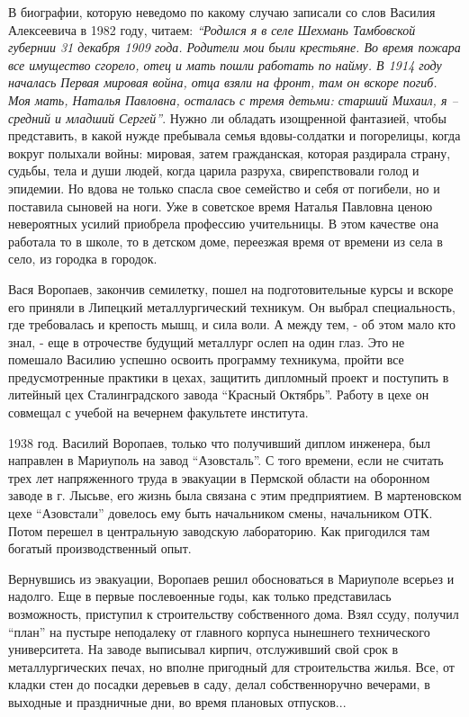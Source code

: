 В биографии, которую неведомо по какому случаю записали со слов Василия
Алексеевича в 1982 году, читаем: \emph{\enquote{Родился я в селе Шехмань Тамбовской губернии
31 декабря 1909 года. Родители мои были крестьяне. Во время пожара все
имущество сгорело, отец и мать пошли работать по найму. В 1914 году началась
Первая мировая война, отца взяли на фронт, там он вскоре погиб. Моя мать,
Наталья Павловна, осталась с тремя детьми: старший Михаил, я – средний и
младший Сергей}}. Нужно ли обладать изощренной фантазией, чтобы представить, в
какой нужде пребывала семья вдовы-солдатки и погорелицы, когда вокруг полыхали
войны: мировая, затем гражданская, которая раздирала страну, судьбы, тела и
души людей, когда царила разруха, свирепствовали голод и эпидемии. Но вдова не
только спасла свое семейство и себя от погибели, но и поставила сыновей на
ноги. Уже в советское время Наталья Павловна ценою невероятных усилий приобрела
профессию учительницы. В этом качестве она работала то в школе, то в детском
доме, переезжая время от времени из села в село, из городка в городок. 

Вася Воропаев, закончив семилетку, пошел на подготовительные курсы и вскоре его
приняли в Липецкий металлургический техникум. Он выбрал специальность, где
требовалась и крепость мышц, и сила воли. А между тем, - об этом мало кто знал,
- еще в отрочестве будущий металлург ослеп на один глаз. Это не помешало
Василию успешно освоить программу техникума, пройти все предусмотренные
практики в цехах, защитить дипломный проект и поступить в литейный цех
Сталинградского завода \enquote{Красный Октябрь}. Работу в цехе он совмещал с учебой на
вечернем факультете института.

1938 год. Василий Воропаев, только что получивший диплом инженера, был
направлен в Мариуполь на завод \enquote{Азовсталь}. С того времени, если не считать
трех лет напряженного труда в эвакуации в Пермской области на оборонном заводе
в г. Лысьве, его жизнь была связана с этим предприятием. В мартеновском цехе
\enquote{Азовстали} довелось ему быть начальником смены, начальником ОТК. Потом перешел
в центральную заводскую лабораторию. Как пригодился там богатый
производственный опыт.

Вернувшись из эвакуации, Воропаев решил обосноваться в Мариуполе всерьез и
надолго. Еще в первые послевоенные годы, как только представилась возможность,
приступил к строительству собственного дома. Взял ссуду, получил \enquote{план} на
пустыре неподалеку от главного корпуса нынешнего технического университета. На
заводе выписывал кирпич, отслуживший свой срок в металлургических печах, но
вполне пригодный для строительства жилья. Все, от кладки стен до посадки
деревьев в саду, делал собственноручно вечерами, в выходные и праздничные дни,
во время плановых отпусков...

